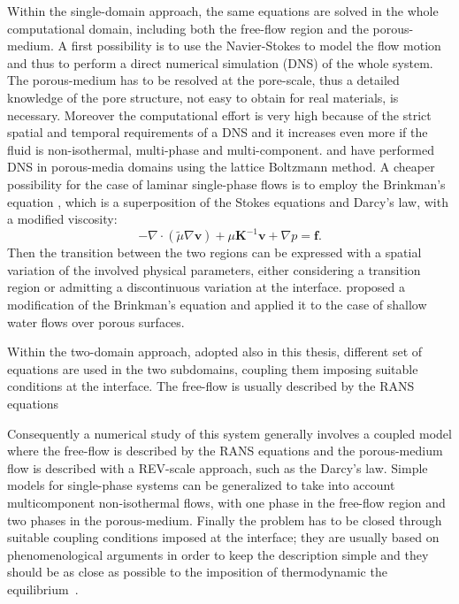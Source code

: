 Within the single-domain approach, the same equations are solved in the whole 
computational domain, including both the free-flow region and the 
porous-medium. A first possibility is to use the Navier-Stokes to model the 
flow motion and thus to perform a direct numerical simulation (DNS) of the 
whole system. The porous-medium has to be resolved at the pore-scale, thus a 
detailed knowledge of the pore structure, not easy to obtain for real 
materials, is necessary. Moreover the computational effort is very high because 
of the strict spatial and temporal requirements of a DNS and it increases even 
more if the fluid is non-isothermal, multi-phase and multi-component. 
\textcite{intro:dns} and \textcite{intro:dns2} have performed DNS in 
porous-media domains using the lattice Boltzmann method. A cheaper possibility 
for the case of laminar single-phase flows is to employ the Brinkman's equation 
\cite{intro:brinkman}, which is a superposition of the Stokes equations and 
Darcy's law, with a modified viscosity:
\begin{equation}
	-\nabla \cdot (\tilde{\mu} \nabla \mathbf{v}) + \mu 
	\mathbf{K}^{-1}\mathbf{v} + \nabla p = \mathbf{f}.
\end{equation}
Then the transition between the two 
regions can be expressed with a spatial variation of the involved physical 
parameters, either considering a transition region or admitting a discontinuous 
variation at the interface. \textcite{intro:shavit} proposed a modification of 
the Brinkman's equation and applied it to the case of shallow water flows over 
porous surfaces.

Within the two-domain approach, adopted also in this thesis, different set of 
equations are used in the two subdomains, coupling them imposing suitable 
conditions at the interface. The free-flow is usually described by the RANS 
equations

Consequently a numerical study of this system generally involves a coupled 
model where the free-flow is described by the RANS equations and the 
porous-medium flow is described with a REV-scale approach, such as the Darcy's 
law. 
Simple models for single-phase systems can be generalized to take 
into account multicomponent non-isothermal flows, with one phase in the 
free-flow region and two phases in the porous-medium. Finally the problem 
has to be closed through suitable coupling conditions imposed at the 
interface; they are usually based on phenomenological arguments in order to 
keep the description simple and they should be as close as possible to the 
imposition of thermodynamic the equilibrium~\cite{paper:mosthaf}.

